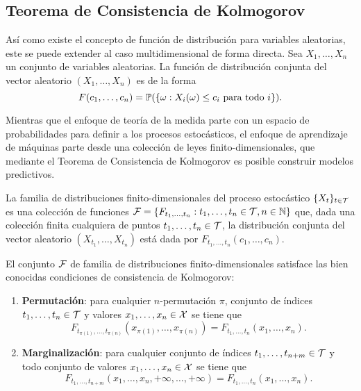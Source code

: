 \subsection{Teorema de Consistencia de Kolmogorov}

Así como existe el concepto de función de distribución para variables aleatorias, este se puede extender al caso multidimensional de forma directa. Sea \(X_1, \dotsc, X_n\) un conjunto de variables aleatorias. La función de distribución conjunta del vector aleatorio \((X_1, \dotsc, X_n)\) es de la forma
\[F(c_1, \dotsc, c_n) = \mathbb{P}(\{\omega : X_i(\omega) \leq c_{i} \text{ para todo } i\}).\]

Mientras que el enfoque de teoría de la medida parte con un espacio de probabilidades para definir a los procesos estocásticos, el enfoque de aprendizaje de máquinas parte desde una colección de leyes finito-dimensionales, que mediante el Teorema de Consistencia de Kolmogorov es posible construir modelos predictivos.

\begin{definition}
	La familia de distribuciones finito-dimensionales del proceso estocástico \(\{X_t\}_{t \in \mathcal{T}}\) es una colección de funciones \(\mathcal{F} = \{F_{t_1, \dotsc, t_n} : t_1, \dotsc, t_n \in \mathcal{T}, n \in \mathbb{N}\}\) que, dada una colección finita cualquiera de puntos \(t_1, \dotsc, t_n\in \mathcal{T}\), la distribución conjunta del vector aleatorio \((X_{t_1}, \dotsc, X_{t_n})\) está dada por \(F_{t_1, \dotsc, t_n} (c_{1}, \dotsc, c_n)\).
\end{definition}

El conjunto \(\mathcal{F}\) de familia de distribuciones finito-dimensionales satisface las bien conocidas condiciones de consistencia de Kolmogorov:
\begin{enumerate}
	\item \textbf{Permutación}: para cualquier \(n\)-permutación \(\pi\), conjunto de índices \(t_1, \dotsc,t_{n} \in \mathcal{T}\) y valores \(x_1, \dotsc,x_n \in \mathcal{X}\) se tiene que
	\[F_{t_{\pi(1)}, \dotsc, t_{\pi(n)}} \left(x_{\pi(1)}, \dotsc, x_{\pi(n)}\right) = F_{t_1, \dotsc, t_n} \left(x_1, \dotsc, x_n\right).\]
	\item \textbf{Marginalización}: para cualquier conjunto de índices \(t_1, \dotsc, t_{n+m} \in \mathcal{T}\) y todo conjunto de valores \(x_1, \dotsc, x_n \in \mathcal{X}\) se tiene que
	\[F_{t_1, \dotsc, t_{n+m}} (x_1, \dotsc, x_n, +\infty, \dotsc, +\infty) = F_{t_1, \dotsc, t_n} (x_1, \dotsc, x_n).\]
\end{enumerate}

